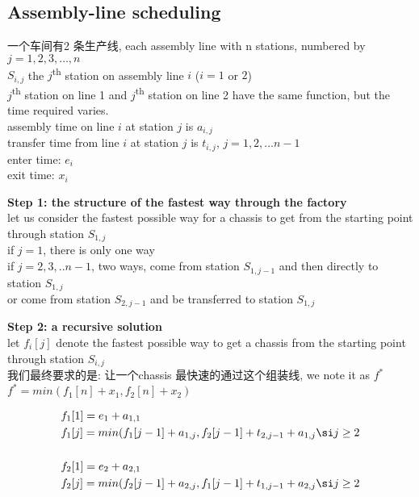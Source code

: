\documentclass{article}
\begin{document}
\subsection{Assembly-line scheduling}
 一个车间有2 条生产线, each assembly line with n stations, numbered by $j = 1, 2, 3, …,n$\\
$S_{i,j}$ the $j$\textsuperscript{th} station on assembly line $i$ ($i = 1$ or $2$)\\
$j$\textsuperscript{th} station on line 1 and $j$\textsuperscript{th} station on line 2 have the same function, but the time required varies.\\
assembly time on line $i$ at station $j$ is $a_{i , j}$\\
transfer time from line $i$ at station $j$ is $t_{i,j}$, $j = 1,2, … n-1$\\
enter time: $e_i$\\
exit time: $x_i$

\textbf{Step 1: the structure of the fastest way through the factory}\\
let us consider the fastest possible way for a chassis to get from the starting point through station $S_{1, j}$\\
if $j =1$, there is only one way\\
if $j=2,3,..n-1$, two ways, come from station $S_{1, j-1}$ and then directly to station $S_{1,j}$\\
or come from station $S_{2, j-1}$ and be transferred to station $S_{1, j}$

\textbf{Step 2: a recursive solution}\\
let $f_i[j]$ denote the fastest possible way to get a chassis from the starting point through station $S_{i,j}$\\
我们最终要求的是: 让一个chassis 最快速的通过这个组装线, we note it as $f^*$\\
$f^* = min(f_1[n] + x_1, f_2[n] + x_2)$

$$
\begin{aligned}
& f_1[1] = e_1 + a_{1,1}\\
& f_1[j] = min(f_1[j-1] + a_{1,j}, f_2[j-1] + t_{2, j-1} + a_{1, j} \si j \geq 2\\
& \\
& f_2[1] = e_2 + a_{2,1}\\
& f_2[j] = min(f_2[j-1] + a_{2,j}, f_1[j-1] + t_{1, j-1} + a_{2, j} \si j \geq 2\\
\end{aligned}
$$
\end{document}

